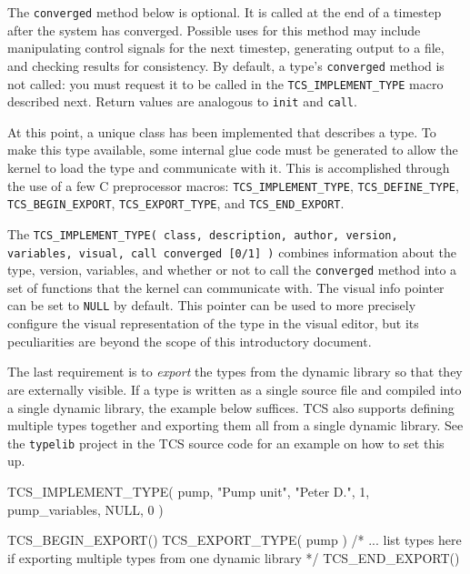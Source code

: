 \documentclass{article}
\begin{document}
The \texttt{converged} method below is optional.  It is called at the end of a timestep after the system has converged.  Possible uses for this method may include manipulating control signals for the next timestep, generating output to a file, and checking results for consistency.  By default, a type's \texttt{converged} method is not called: you must request it to be called in the \texttt{TCS\_IMPLEMENT\_TYPE} macro described next.  Return values are analogous to \texttt{init} and \texttt{call}.

\begin{verbatimtab}[4]	

	virtual int converged( double time )
	{
		return 0;
	}
};

\end{verbatimtab}

At this point, a unique class has been implemented that describes a type.  To make this type available, some internal glue code must be generated to allow the kernel to load the type and communicate with it.  This is accomplished through the use of a few C preprocessor macros: \texttt{TCS\_IMPLEMENT\_TYPE}, \texttt{TCS\_DEFINE\_TYPE}, \texttt{TCS\_BEGIN\_EXPORT}, \texttt{TCS\_EXPORT\_TYPE}, and \texttt{TCS\_END\_EXPORT}.

The \texttt{TCS\_IMPLEMENT\_TYPE( class, description, author, version, variables, visual, call converged [0/1] )} combines information about the type, version, variables, and whether or not to call the \texttt{converged} method into a set of functions that the kernel can communicate with.  The visual info pointer can be set to \texttt{NULL} by default.  This pointer can be used to more precisely configure the visual representation of the type in the visual editor, but its peculiarities are beyond the scope of this introductory document.  

The last requirement is to \emph{export} the types from the dynamic library so that they are externally visible.  If a type is written as a single source file and compiled into a single dynamic library, the example below suffices.  TCS also supports defining multiple types together and exporting them all from a single dynamic library.  See the \texttt{typelib} project in the TCS source code for an example on how to set this up.

\begin{verbatimtab}[4]

TCS_IMPLEMENT_TYPE( pump, "Pump unit", "Peter D.", 1, pump_variables, NULL, 0 )


TCS_BEGIN_EXPORT()
	TCS_EXPORT_TYPE( pump )
	/* ... list types here if exporting 
           multiple types from one dynamic library */
TCS_END_EXPORT()
\end{verbatimtab}
\end{document}
